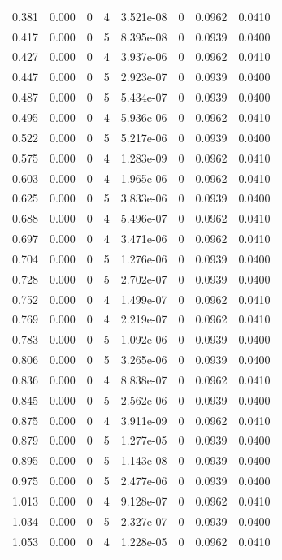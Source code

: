 \documentclass[preview]{standalone}
\begin{document}
{{\begin{tabular}{L{1.2cm}C{1.2cm} C{0.3cm}C{0.5cm} C{1.4cm}C{1.4cm} C{1.4cm}C{1.4cm}}
  0.381  &  0.000  & 0     &  4 &  3.521e-08  & 0  & 0.0962 &  0.0410   \\ 
  0.417  &  0.000  & 0     &  5 &  8.395e-08  & 0  & 0.0939 &  0.0400   \\ 
  0.427  &  0.000  & 0     &  4 &  3.937e-06  & 0  & 0.0962 &  0.0410   \\ 
  0.447  &  0.000  & 0     &  5 &  2.923e-07  & 0  & 0.0939 &  0.0400   \\ 
  0.487  &  0.000  & 0     &  5 &  5.434e-07  & 0  & 0.0939 &  0.0400   \\ 
  0.495  &  0.000  & 0     &  4 &  5.936e-06  & 0  & 0.0962 &  0.0410   \\ 
  0.522  &  0.000  & 0     &  5 &  5.217e-06  & 0  & 0.0939 &  0.0400   \\ 
  0.575  &  0.000  & 0     &  4 &  1.283e-09  & 0  & 0.0962 &  0.0410   \\ 
  0.603  &  0.000  & 0     &  4 &  1.965e-06  & 0  & 0.0962 &  0.0410   \\ 
  0.625  &  0.000  & 0     &  5 &  3.833e-06  & 0  & 0.0939 &  0.0400   \\ 
  0.688  &  0.000  & 0     &  4 &  5.496e-07  & 0  & 0.0962 &  0.0410   \\ 
  0.697  &  0.000  & 0     &  4 &  3.471e-06  & 0  & 0.0962 &  0.0410   \\ 
  0.704  &  0.000  & 0     &  5 &  1.276e-06  & 0  & 0.0939 &  0.0400   \\ 
  0.728  &  0.000  & 0     &  5 &  2.702e-07  & 0  & 0.0939 &  0.0400   \\ 
  0.752  &  0.000  & 0     &  4 &  1.499e-07  & 0  & 0.0962 &  0.0410   \\ 
  0.769  &  0.000  & 0     &  4 &  2.219e-07  & 0  & 0.0962 &  0.0410   \\ 
  0.783  &  0.000  & 0     &  5 &  1.092e-06  & 0  & 0.0939 &  0.0400   \\ 
  0.806  &  0.000  & 0     &  5 &  3.265e-06  & 0  & 0.0939 &  0.0400   \\ 
  0.836  &  0.000  & 0     &  4 &  8.838e-07  & 0  & 0.0962 &  0.0410   \\ 
  0.845  &  0.000  & 0     &  5 &  2.562e-06  & 0  & 0.0939 &  0.0400   \\ 
  0.875  &  0.000  & 0     &  4 &  3.911e-09  & 0  & 0.0962 &  0.0410   \\ 
  0.879  &  0.000  & 0     &  5 &  1.277e-05  & 0  & 0.0939 &  0.0400   \\ 
  0.895  &  0.000  & 0     &  5 &  1.143e-08  & 0  & 0.0939 &  0.0400   \\ 
  0.975  &  0.000  & 0     &  5 &  2.477e-06  & 0  & 0.0939 &  0.0400   \\ 
  1.013  &  0.000  & 0     &  4 &  9.128e-07  & 0  & 0.0962 &  0.0410   \\ 
  1.034  &  0.000  & 0     &  5 &  2.327e-07  & 0  & 0.0939 &  0.0400   \\ 
  1.053  &  0.000  & 0     &  4 &  1.228e-05  & 0  & 0.0962 &  0.0410   \\ 
\hline 
\end{tabular} 

}}
\end{document}
